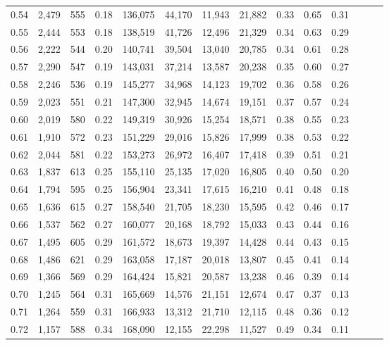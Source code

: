 \begin{tabular}{rrrrrrrrrrrrrr}
0.54 &  2,479 &  555 &  0.18 &  136,075 &   44,170 &  11,943 &  21,882 &  0.33 &  0.65 &      0.31 \\
0.55 &  2,444 &  553 &  0.18 &  138,519 &   41,726 &  12,496 &  21,329 &  0.34 &  0.63 &      0.29 \\
0.56 &  2,222 &  544 &  0.20 &  140,741 &   39,504 &  13,040 &  20,785 &  0.34 &  0.61 &      0.28 \\
0.57 &  2,290 &  547 &  0.19 &  143,031 &   37,214 &  13,587 &  20,238 &  0.35 &  0.60 &      0.27 \\
0.58 &  2,246 &  536 &  0.19 &  145,277 &   34,968 &  14,123 &  19,702 &  0.36 &  0.58 &      0.26 \\
0.59 &  2,023 &  551 &  0.21 &  147,300 &   32,945 &  14,674 &  19,151 &  0.37 &  0.57 &      0.24 \\
0.60 &  2,019 &  580 &  0.22 &  149,319 &   30,926 &  15,254 &  18,571 &  0.38 &  0.55 &      0.23 \\
0.61 &  1,910 &  572 &  0.23 &  151,229 &   29,016 &  15,826 &  17,999 &  0.38 &  0.53 &      0.22 \\
0.62 &  2,044 &  581 &  0.22 &  153,273 &   26,972 &  16,407 &  17,418 &  0.39 &  0.51 &      0.21 \\
0.63 &  1,837 &  613 &  0.25 &  155,110 &   25,135 &  17,020 &  16,805 &  0.40 &  0.50 &      0.20 \\
0.64 &  1,794 &  595 &  0.25 &  156,904 &   23,341 &  17,615 &  16,210 &  0.41 &  0.48 &      0.18 \\
0.65 &  1,636 &  615 &  0.27 &  158,540 &   21,705 &  18,230 &  15,595 &  0.42 &  0.46 &      0.17 \\
0.66 &  1,537 &  562 &  0.27 &  160,077 &   20,168 &  18,792 &  15,033 &  0.43 &  0.44 &      0.16 \\
0.67 &  1,495 &  605 &  0.29 &  161,572 &   18,673 &  19,397 &  14,428 &  0.44 &  0.43 &      0.15 \\
0.68 &  1,486 &  621 &  0.29 &  163,058 &   17,187 &  20,018 &  13,807 &  0.45 &  0.41 &      0.14 \\
0.69 &  1,366 &  569 &  0.29 &  164,424 &   15,821 &  20,587 &  13,238 &  0.46 &  0.39 &      0.14 \\
0.70 &  1,245 &  564 &  0.31 &  165,669 &   14,576 &  21,151 &  12,674 &  0.47 &  0.37 &      0.13 \\
0.71 &  1,264 &  559 &  0.31 &  166,933 &   13,312 &  21,710 &  12,115 &  0.48 &  0.36 &      0.12 \\
0.72 &  1,157 &  588 &  0.34 &  168,090 &   12,155 &  22,298 &  11,527 &  0.49 &  0.34 &      0.11 \\

\end{tabular}
